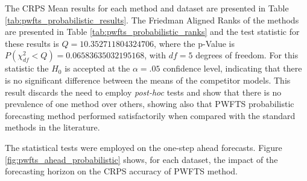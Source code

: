 The CRPS Mean results for each method and dataset are presented in Table \ref{tab:pwfts_probabilistic_results}. The Friedman Aligned Ranks of the methods are presented in Table \ref{tab:pwfts_probabilistic_ranks} and the test statistic for these results is $Q = 10.352711804324706$, where the p-Value is $P(\chi ^2_{df} < Q) = 0.06583635032195168$, with $df=5$ degrees of freedom. For this statistic the $H_0$ is accepted at the $\alpha = .05$ confidence level, indicating that there is no significant difference between the means of the competitor models. This result discards the need to employ \textit{post-hoc} tests and show that there is no prevalence of one method over others, showing also that PWFTS probabilistic forecasting method performed satisfactorily when compared with the standard methods in the literature. 

The statistical tests were employed on the one-step ahead forecasts. Figure \ref{fig:pwfts_ahead_probabilistic} shows, for each dataset, the impact of the forecasting horizon on the CRPS accuracy of PWFTS method.

\begin{table}[h]
    \caption{CRPS for one step ahead interval forecasts}
    \label{tab:pwfts_probabilistic_results}
\end{table}

